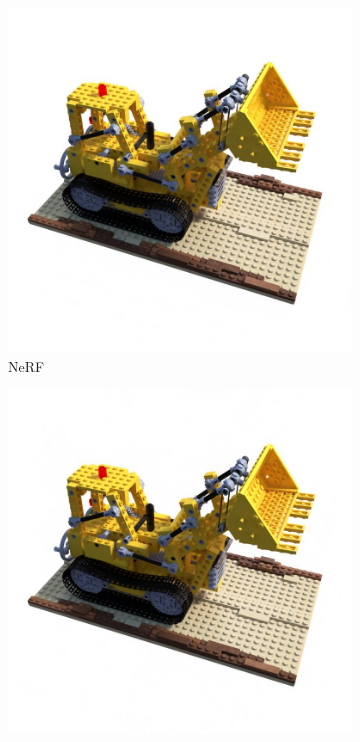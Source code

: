 \documentclass[12pt, a4paper, twoside]{book}
\numberwithin{equation}{chapter}
\numberwithin{theorem}{section}
\numberwithin{definition}{section}
\numberwithin{definitionChapter}{chapter}
\begin{document}
\begin{figure}[H]
\begin{subfigure}{0.475\textwidth}
			\includegraphics[scale=0.25]{img/nerf/nerf_lego_31.jpg}
			\caption{NeRF}
		\end{subfigure}
		\begin{subfigure}{0.475\textwidth}
			\centering
			\includegraphics[scale=0.25]{img/mipnerf/mipnerf_lego_31.jpg}

\end{subfigure}
\end{figure}
\end{document}
